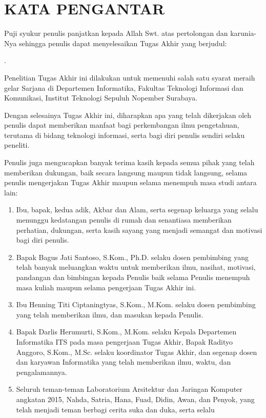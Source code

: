 \chapter{KATA PENGANTAR}
\indent\indent Puji syukur penulis panjatkan kepada Allah Swt. atas pertolongan dan karunia-Nya sehingga penulis dapat menyelesaikan Tugas Akhir yang berjudul:
\begin{center}
	\textbf{\MakeUppercase{\judul}}.
\end{center}

Penelitian Tugas Akhir ini dilakukan untuk memenuhi salah satu syarat meraih gelar Sarjana di Departemen Informatika, Fakultas Teknologi Informasi dan Komunikasi, Institut Teknologi Sepuluh Nopember Surabaya.

Dengan selesainya Tugas Akhir ini, diharapkan apa yang telah dikerjakan oleh penulis dapat memberikan manfaat bagi perkembangan ilmu pengetahuan, terutama di bidang teknologi informasi, serta bagi diri penulis sendiri selaku peneliti.

Penulis juga mengucapkan banyak terima kasih kepada semua pihak yang telah memberikan dukungan, baik secara langsung maupun tidak langsung, selama penulis mengerjakan Tugas Akhir maupun selama menempuh masa studi antara lain:

\begin{enumerate}
	\item Ibu, bapak, kedua adik, Akbar dan Alam, serta segenap keluarga yang selalu menunggu kedatangan penulis di rumah dan senantiasa memberikan perhatian, dukungan, serta kasih sayang yang menjadi semangat dan motivasi bagi diri penulis.
	\item Bapak Bagus Jati Santoso, S.Kom., Ph.D. selaku dosen pembimbing yang telah banyak meluangkan waktu untuk memberikan ilmu, nasihat, motivasi, pandangan dan bimbingan kepada Penulis baik selama Penulis menempuh masa kuliah maupun selama pengerjaan Tugas Akhir ini.
	\item Ibu Henning Titi Ciptaningtyas, S.Kom., M.Kom. selaku dosen pembimbing yang telah memberikan ilmu, dan masukan kepada Penulis.
	\item Bapak Darlis Herumurti, S.Kom., M.Kom. selaku Kepala Departemen Informatika ITS pada masa pengerjaan Tugas Akhir, Bapak Radityo Anggoro, S.Kom., M.Sc. selaku koordinator Tugas Akhir, dan segenap dosen dan karyawan Informatika yang telah memberikan ilmu, waktu, dan pengalamannya.
	\item Seluruh teman-teman Laboratorium Arsitektur dan Jaringan Komputer angkatan 2015, Nahda, Satria, Hana, Fuad, Didin, Awan, dan Penyok, yang telah menjadi teman berbagi cerita suka dan duka, serta selalu 
\end{enumerate}

